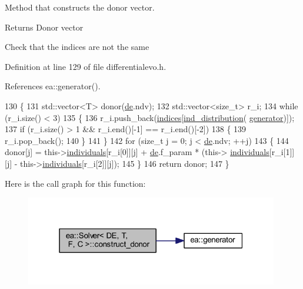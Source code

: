 Method that constructs the donor vector. 

\begin{DoxyReturn}{Returns}
Donor vector 
\end{DoxyReturn}
Check that the indices are not the same 

Definition at line 129 of file differentialevo.\+h.



References ea\+::generator().


\begin{DoxyCode}
130     \{
131         std::vector<T> donor(\hyperlink{classea_1_1_solver_3_01_d_e_00_01_t_00_01_f_00_01_c_01_4_a789b8665ce321248e3999907c37d0963}{de}.ndv);
132         std::vector<size\_t> r\_i;
134         \textcolor{keywordflow}{while} (r\_i.size() < 3)
135         \{
136             r\_i.push\_back(\hyperlink{classea_1_1_solver_3_01_d_e_00_01_t_00_01_f_00_01_c_01_4_a8428ecceaab1c7e26715ed2f72654693}{indices}[\hyperlink{classea_1_1_solver_3_01_d_e_00_01_t_00_01_f_00_01_c_01_4_a2f762378d566944899b2a07a5c74fc7f}{ind\_distribution}(
      \hyperlink{namespaceea_a385e8ca8ba4ae2f69dcfffa79f20c2ff}{generator})]);
137             \textcolor{keywordflow}{if} (r\_i.size() > 1 && r\_i.end()[-1] == r\_i.end()[-2])
138             \{
139                 r\_i.pop\_back();
140             \}
141         \}
142         \textcolor{keywordflow}{for} (\textcolor{keywordtype}{size\_t} j = 0; j < \hyperlink{classea_1_1_solver_3_01_d_e_00_01_t_00_01_f_00_01_c_01_4_a789b8665ce321248e3999907c37d0963}{de}.ndv; ++j)
143         \{
144             donor[j] = this->\hyperlink{classea_1_1_solver__base_ad75bc440d24a46e97694c7c889f2ecde}{individuals}[r\_i[0]][j] + \hyperlink{classea_1_1_solver_3_01_d_e_00_01_t_00_01_f_00_01_c_01_4_a789b8665ce321248e3999907c37d0963}{de}.f\_param * (this->
      \hyperlink{classea_1_1_solver__base_ad75bc440d24a46e97694c7c889f2ecde}{individuals}[r\_i[1]][j] - this->\hyperlink{classea_1_1_solver__base_ad75bc440d24a46e97694c7c889f2ecde}{individuals}[r\_i[2]][j]);
145         \}
146         \textcolor{keywordflow}{return} donor;
147     \}
\end{DoxyCode}
Here is the call graph for this function\+:
\nopagebreak
\begin{figure}[H]
\begin{center}
\leavevmode
\includegraphics[width=313pt]{classea_1_1_solver_3_01_d_e_00_01_t_00_01_f_00_01_c_01_4_a69dabdddba116ddb5685355119bd77e0_cgraph}
\end{center}
\end{figure}

